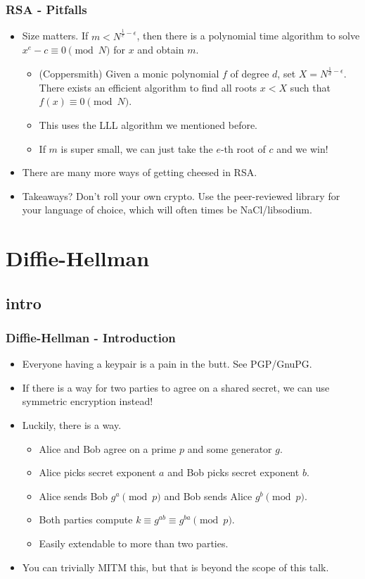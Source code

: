 \documentclass[aspectratio=169,t]{beamer}
\begin{document}
\begin{frame}
\frametitle{RSA - Pitfalls}
\begin{itemize}
\item
Size matters. If $m < N^{\frac{1}{e} - \epsilon}$, then there is a polynomial
time algorithm to solve $x^e - c \equiv 0 \pmod{N}$ for $x$ and obtain $m$.
\pause
\begin{itemize}
\item
(Coppersmith) Given a monic polynomial $f$ of degree $d$, set $X =
N^{\frac{1}{d} - \epsilon}$. There exists an efficient algorithm to find all
roots $x < X$ such that $f(x) \equiv 0 \pmod{N}$.
\item
This uses the LLL algorithm we mentioned before. \pause
\item
If $m$ is super small, we can just take the $e$-th root of $c$ and we win!
\end{itemize}
\pause
\item
There are many more ways of getting cheesed in RSA. \pause
\item
Takeaways? Don't roll your own crypto. Use the peer-reviewed library for your
language of choice, which will often times be NaCl/libsodium.
\end{itemize}
\end{frame}

\section{Diffie-Hellman}

\subsection{intro}
\begin{frame}
\frametitle{Diffie-Hellman - Introduction}
\begin{itemize}
\item
Everyone having a keypair is a pain in the butt. See PGP/GnuPG. \pause
\item
If there is a way for two parties to agree on a shared secret, we can use
symmetric encryption instead! \pause
\item
Luckily, there is a way. \pause
\begin{itemize}
\item
Alice and Bob agree on a prime $p$ and some generator $g$.
\item
Alice picks secret exponent $a$ and Bob picks secret exponent $b$.
\item
Alice sends Bob $g^a \pmod{p}$ and Bob sends Alice $g^b \pmod{p}$.
\item
Both parties compute $k \equiv g^{ab} \equiv g^{ba} \pmod{p}$.
\item
Easily extendable to more than two parties.
\end{itemize}
\pause
\item
You can trivially MITM this, but that is beyond the scope of this talk.
\end{itemize}
\end{frame}
\end{document}
